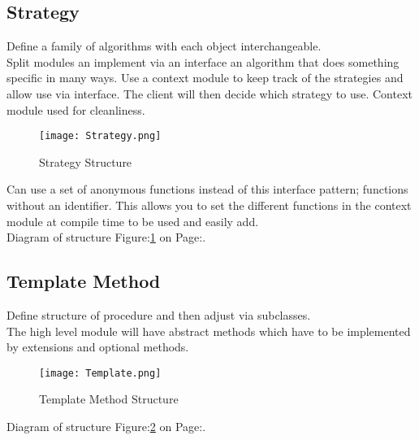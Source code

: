 \documentclass[11pt]{scrartcl} %
\begin{document}
\subsection{Strategy}

Define a family of algorithms with each object interchangeable.\\

Split modules an implement via an interface an algorithm that does something specific in many ways. Use a context 
module to keep track of the strategies and allow use via interface. The client will then decide which strategy to use.
Context module used for cleanliness.\\

\begin{figure}[h] %
	\centering
	\texttt{[image: Strategy.png]} %
	\caption{Strategy Structure}
	\label{Strategy Structure}
\end{figure}

Can use a set of anonymous functions instead of this interface pattern; functions without an identifier. This 
allows you to set the different functions in the context module at compile time to be used and easily add.\\

Diagram of structure Figure:\ref{Strategy Structure} on Page:\pageref{Strategy Structure}.

\subsection{Template Method}

Define structure of procedure and then adjust via subclasses.\\

The high level module will have abstract methods which have to be implemented by extensions and optional methods.\\

\begin{figure}[h] %
	\centering
	\texttt{[image: Template.png]} %
	\caption{Template Method Structure}
	\label{Template Method Structure}
\end{figure}

Diagram of structure Figure:\ref{Template Method Structure} on Page:\pageref{Template Method Structure}.
\end{document}
